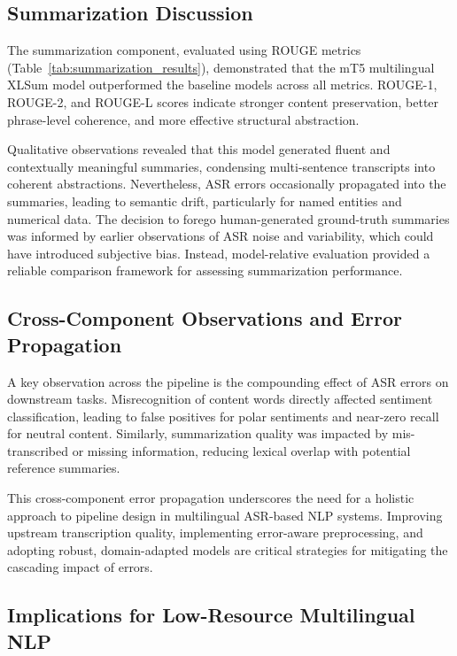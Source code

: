 \subsection{Summarization Discussion}

The summarization component, evaluated using ROUGE metrics (Table~\ref{tab:summarization_results}), demonstrated that the mT5 multilingual XLSum model outperformed the baseline models across all metrics. ROUGE-1, ROUGE-2, and ROUGE-L scores indicate stronger content preservation, better phrase-level coherence, and more effective structural abstraction.

Qualitative observations revealed that this model generated fluent and contextually meaningful summaries, condensing multi-sentence transcripts into coherent abstractions. Nevertheless, ASR errors occasionally propagated into the summaries, leading to semantic drift, particularly for named entities and numerical data. The decision to forego human-generated ground-truth summaries was informed by earlier observations of ASR noise and variability, which could have introduced subjective bias. Instead, model-relative evaluation provided a reliable comparison framework for assessing summarization performance.

\subsection{Cross-Component Observations and Error Propagation}

A key observation across the pipeline is the compounding effect of ASR errors on downstream tasks. Misrecognition of content words directly affected sentiment classification, leading to false positives for polar sentiments and near-zero recall for neutral content. Similarly, summarization quality was impacted by mis-transcribed or missing information, reducing lexical overlap with potential reference summaries.

This cross-component error propagation underscores the need for a holistic approach to pipeline design in multilingual ASR-based NLP systems. Improving upstream transcription quality, implementing error-aware preprocessing, and adopting robust, domain-adapted models are critical strategies for mitigating the cascading impact of errors.

\subsection{Implications for Low-Resource Multilingual NLP}

